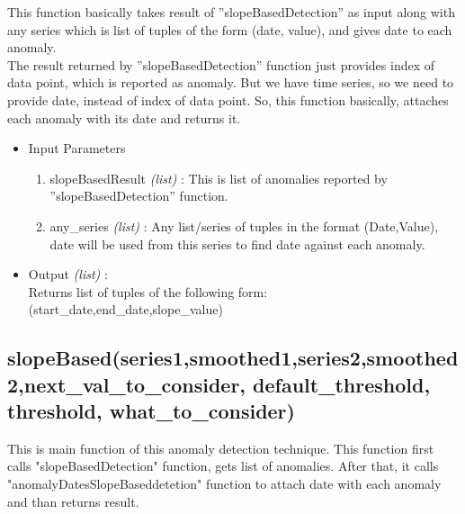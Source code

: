 This function basically takes result of ”slopeBasedDetection” as input along with
any series which is list of tuples of the form (date, value), and gives date to each
anomaly.\\

The result returned by ”slopeBasedDetection” function just provides index of
data point, which is reported as anomaly. But we have time series, so we need
to provide date, instead of index of data point. So, this function basically,
attaches each anomaly with its date and returns it.\\

\begin{itemize}
 \item Input Parameters
 
 \begin{enumerate}
  \item slopeBasedResult \textit{(list)} : This is list of anomalies reported by ”slopeBasedDetection” function.
  \item any\_series \textit{(list)} : Any list/series of tuples in the format (Date,Value), date will be used from this series to find date against each anomaly.
 \end{enumerate}

 \item Output \textit{(list)} : \\
 	Returns list of tuples of the following form: \\ 
 	(start\_date,end\_date,slope\_value)

\end{itemize}


\subsection{slopeBased(series1,smoothed1,series2,smoothed2,next\_val\_to\_consider, default\_threshold, threshold, what\_to\_consider)}

This is main function of this anomaly detection technique. This function first calls "slopeBasedDetection" function, gets list of anomalies. 
After that, it calls "anomalyDatesSlopeBaseddetetion" function to attach date with each anomaly and than returns result.

